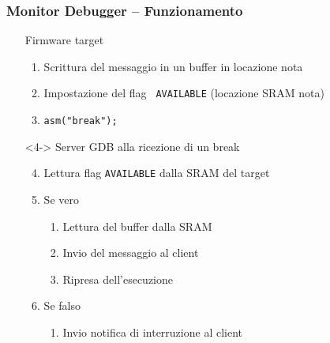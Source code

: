 \documentclass[aspectratio=169,
]{beamer}
\begin{document}
    \begin{frame}
        \frametitle{Monitor Debugger -- Funzionamento}
        \hspace*{-10mm}\begin{minipage}{.7\textwidth}
            \begin{itemize}
                \item[] {\color{blue} Firmware target}
                \begin{enumerate}
                    \item <1-> Scrittura del messaggio in un {\color{purple} buffer} in locazione nota
                    \item <2-> Impostazione del flag \texttt{\color{red} AVAILABLE} (locazione SRAM nota)
                    \item <3-> \texttt{asm("break");}
                \end{enumerate}
                \item[] <4-> {\color{orange} Server GDB} alla ricezione di un break
                \begin{enumerate}
                    \setcounter{enumi}{3}
                    \item <4-> Lettura flag {\color{red} \texttt{AVAILABLE}} dalla {\color{gray} SRAM} del target
                    \item <5-> Se vero
                    \begin{enumerate}
                        \item <5-> Lettura del {\color{purple} buffer} dalla SRAM
                        \item <5-> Invio del messaggio al {\color{brown} client}
                        \item <5-> Ripresa dell'esecuzione
                    \end{enumerate}
                    \item <6-> Se falso
                    \begin{enumerate}
                        \item <6-> Invio notifica di interruzione al {\color{brown} client}
                    \end{enumerate}
                \end{enumerate}
            \end{itemize}     
        \end{minipage}
        \begin{minipage}{.28\textwidth}
            \begin{figure}
                \begin{tikzpicture}[scale=.8, label distance=-2mm]


\end{tikzpicture}
\end{figure}
\end{minipage}
\end{frame}
\end{document}
